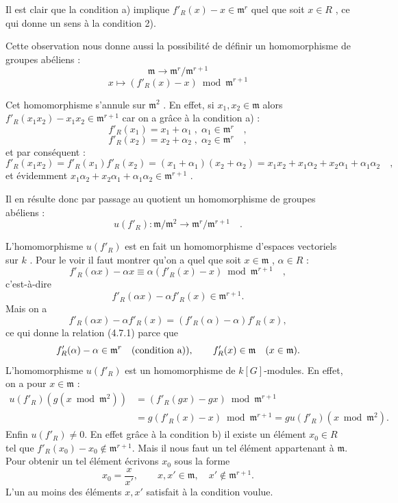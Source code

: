 \documentclass[11pt]{article}
\providecommand{\fm}{\mathfrak{m}}
\providecommand{\fm}{\mathfrak m}
\begin{document}
Il est clair que la condition a) implique $f'_R(x) - x \in \fm^r$ quel que soit $x \in R$ , ce qui donne un sens à la condition 2).

Cette observation nous donne aussi la possibilité de définir un homomorphisme de groupes abéliens :
\[
\fm \longrightarrow \fm^r/\fm^{r+1}
\]
\[
x \longmapsto (f'_R(x) - x) \bmod \fm^{r+1}
\]

Cet homomorphisme s'annule sur $\fm^2$ . En effet, si $x_1, x_2 \in \fm$ alors $f'_R(x_1x_2) - x_1x_2 \in \fm^{r+1}$ car on a grâce à la condition a) :
\[
f'_R(x_1) = x_1 + \alpha_1 \; , \; \alpha_1 \in \fm^r \quad ,
\]
\[
f'_R(x_2) = x_2 + \alpha_2 \; , \; \alpha_2 \in \fm^r \quad ,
\]
et par conséquent :
\[
f'_R(x_1x_2) = f'_R(x_1)f'_R(x_2) = (x_1 + \alpha_1)(x_2 + \alpha_2) = x_1x_2 + x_1\alpha_2 + x_2\alpha_1 + \alpha_1\alpha_2 \quad ,
\]
et évidemment $x_1\alpha_2 + x_2\alpha_1 + \alpha_1\alpha_2 \in \fm^{r+1}$ .

Il en résulte donc par passage au quotient un homomorphisme de groupes abéliens :
\[
u(f'_R) : \fm/\fm^2 \longrightarrow \fm^r/\fm^{r+1} \quad .
\]

L'homomorphisme $u(f'_R)$ est en fait un homomorphisme d'espaces vectoriels sur $k$ . Pour le voir il faut montrer qu'on a quel que soit $x \in \fm$ , $\alpha \in R$ :
\[
f'_R(\alpha x) - \alpha x \equiv \alpha(f'_R(x) - x) \bmod \fm^{r+1} \quad ,
\]
c'est-à-dire
\begin{equation}
\tag{4.7.1}
f'_R(\alpha x)-\alpha f'_R(x)\in\fm^{r+1}.
\end{equation}
Mais on a
\[
f'_R(\alpha x)-\alpha f'_R(x)=(f'_R(\alpha)-\alpha)f'_R(x),
\]
ce qui donne la relation (4.7.1) parce que
\[
f'_R(\alpha)-\alpha\in\fm^r\quad\hbox{(condition a))},
\qquad
f'_R(x)\in\fm\quad (x\in\fm).
\]
L'homomorphisme $u(f'_R)$ est un homomorphisme de $k[G]$-modules. En effet, on a pour $x\in\fm$ :
\[
\begin{aligned}
u(f'_R)(g(x\bmod\fm^2))
&=(f'_R(gx)-gx)\bmod\fm^{r+1}\\
&=g(f'_R(x)-x)\bmod\fm^{r+1}
=gu(f'_R)(x\bmod\fm^2).
\end{aligned}
\]
Enfin $u(f'_R)\ne0$. En effet grâce à la condition b) il existe un élément $x_0\in R$ tel que $f'_R(x_0)-x_0\notin\fm^{r+1}$. Mais il nous faut un tel élément appartenant à $\fm$. Pour obtenir un tel élément écrivons $x_0$ sous la forme
\[
x_0=\frac{x}{x'},\qquad x,x'\in\fm,\quad x'\notin\fm^{r+1}.
\]
L'un au moins des éléments $x,x'$ satisfait à la condition voulue.
\end{document}
